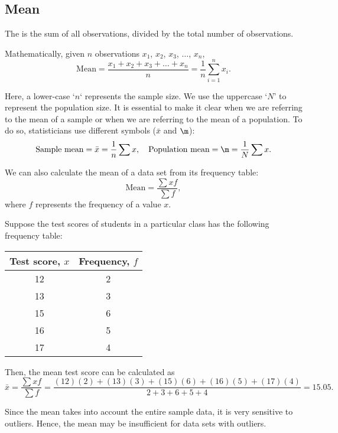 \subsection{Mean}

\begin{definition}
    The  is the sum of all observations, divided by the total number of observations.
\end{definition}

Mathematically, given $n$ observations $x_1$, $x_2$, $x_3$, $\dots$, $x_n$, \[\text{Mean} = \frac{x_1 + x_2 + x_3 + \dots + x_n}{n} = \frac1n \sum_{i = 1}^n x_i.\]

Here, a lower-case `$n$` represents the sample size. We use the uppercase `$N$' to represent the population size. It is essential to make it clear when we are referring to the mean of a sample or when we are referring to the mean of a population. To do so, statisticians use different symbols ($\bar{x}$ and $\m$): \[\text{Sample mean} = \bar{x} = \frac1n \sum x, \quad \text{Population mean} = \m = \frac1N \sum x.\]

We can also calculate the mean of a data set from its frequency table: \[\text{Mean} = \frac{\sum xf}{\sum f},\] where $f$ represents the frequency of a value $x$. 

\begin{example}
    Suppose the test scores of students in a particular class has the following frequency table:

    \begin{center}
        \begin{tabular}{|c|c|}
        \hline
        \textbf{Test score, $x$} & \textbf{Frequency, $f$} \\ \hline\hline
        12 & 2 \\ \hline
        13 & 3 \\ \hline
        15 & 6 \\ \hline
        16 & 5 \\ \hline
        17 & 4 \\ \hline
        \end{tabular}
    \end{center}

    Then, the mean test score can be calculated as \[\bar{x} = \frac{\sum xf}{\sum f} = \frac{(12)(2) + (13)(3) + (15)(6) + (16)(5) + (17)(4)}{2 + 3 + 6 + 5 + 4} = 15.05.\]
\end{example}

Since the mean takes into account the entire sample data, it is very sensitive to outliers. Hence, the mean may be insufficient for data sets with outliers. 

